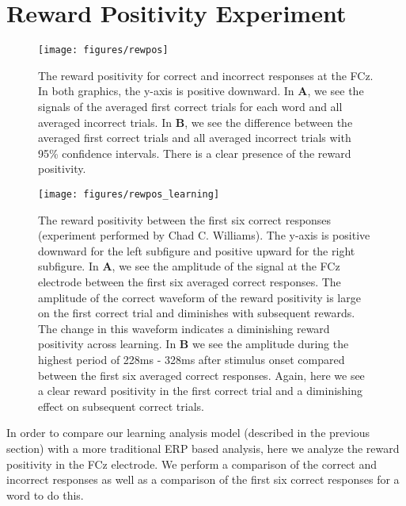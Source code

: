 \section{Reward Positivity Experiment}

\begin{figure}[t]
  \centerline{
    \texttt{[image: figures/rewpos]}
  }
  \caption[Reward Positivity for Correct and Incorrect Responses]{
    The reward positivity for correct and incorrect responses at the FCz. In 
    both graphics, the y-axis is positive downward. In {\bf A}, we see the 
    signals of the averaged first correct trials for each word and all averaged 
    incorrect trials. In {\bf B}, we see the difference between the averaged 
    first correct trials and all averaged incorrect trials with 95\% confidence 
    intervals.  There is a clear presence of the reward positivity.
  }
  \label{fig:rewpos}
\end{figure}

\begin{figure}[t]
  \centerline{
    \texttt{[image: figures/rewpos\_learning]}
  }
  \caption[Reward Positivity between the First Six Correct Responses]{
    The reward positivity between the first six correct responses (experiment 
    performed by Chad C. Williams). The y-axis is positive downward for the 
    left subfigure and positive upward for the right subfigure. In {\bf A}, we 
    see the amplitude of the signal at the FCz electrode between the first six 
    averaged correct responses. The amplitude of the correct waveform of the 
    reward positivity is large on the first correct trial and diminishes with 
    subsequent rewards.  The change in this waveform indicates a diminishing 
    reward positivity across learning. In {\bf B} we see the amplitude during 
    the highest period of 228ms - 328ms after stimulus onset compared between 
    the first six averaged correct responses.  Again, here we see a clear 
    reward positivity in the first correct trial and a diminishing effect on 
    subsequent correct trials.
  }
  \label{fig:rewpos_learning}
\end{figure}

In order to compare our learning analysis model (described in the previous 
section) with a more traditional ERP based analysis, here we analyze the reward 
positivity in the FCz electrode. We perform a comparison of the correct and 
incorrect responses as well as a comparison of the first six correct responses 
for a word to do this.

